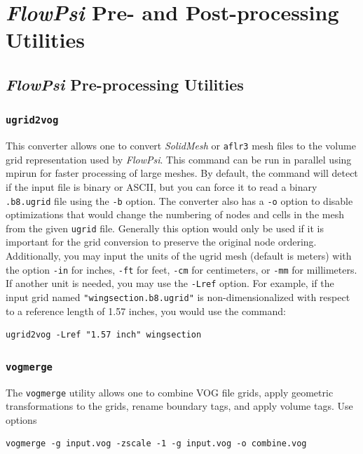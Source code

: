 \documentclass{article}
\begin{document}
\section{{\em FlowPsi} Pre- and Post-processing Utilities}

\subsection{{\em FlowPsi} Pre-processing Utilities}

\subsubsection{\tt ugrid2vog}

This converter allows one to convert {\it SolidMesh} or {\tt aflr3}
mesh files to the volume grid representation used by {\em FlowPsi}.  This
command can be run in parallel using mpirun for faster processing of
large meshes.  By default, the command will detect if the input file is
binary or ASCII, but you can force it to read a binary {\tt .b8.ugrid}
file using the {\tt -b} option.  The converter also has a {\tt -o}
option to disable optimizations that would change the numbering of
nodes and cells in the mesh from the given {\tt ugrid} file.
Generally this option would only be used if it is important for the
grid conversion to preserve the original node ordering.  Additionally,
you may input the units of the ugrid mesh (default is meters) with the option {\tt -in}
for inches, {\tt -ft} for feet, {\tt -cm} for centimeters, or {\tt -mm} for millimeters.  If another
unit is needed, you may use the {\tt -Lref} option. For example, if the
input grid named {\tt "wingsection.b8.ugrid"} is
non-dimensionalized with respect to a reference length
of 1.57 inches, you would use the command:
\begin{verbatim}
ugrid2vog -Lref "1.57 inch" wingsection
\end{verbatim}

\subsubsection{\tt vogmerge}

The {\tt vogmerge} utility allows one to combine VOG file grids, apply
geometric transformations to the grids, rename boundary tags, and
apply volume tags.  Use options 

\begin{verbatim}
vogmerge -g input.vog -zscale -1 -g input.vog -o combine.vog
\end{verbatim}
\end{document}
